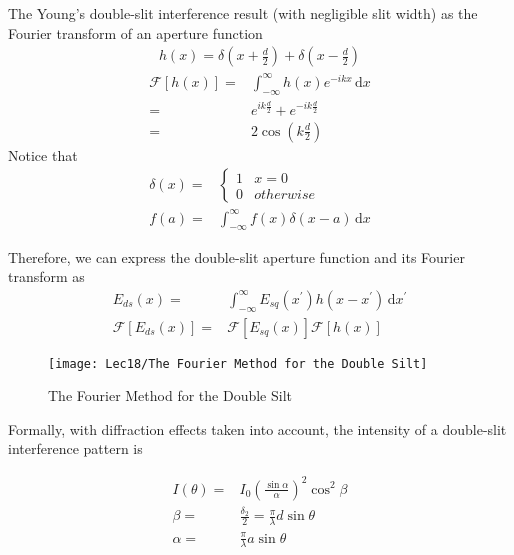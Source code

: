 The Young's double-slit interference result (with negligible slit width) as the Fourier transform of an aperture function
\begin{align*}
    h(x)=\delta\left(x+\frac{d}{2}\right)+\delta\left(x-\frac{d}{2}\right)
\end{align*}
\begin{align*}
    \mathcal{F}[h(x)]=&\int_{-\infty}^{\infty} h(x)e^{-ikx}\,\mathrm{d}x\\
    =&e^{ik\frac{d}{2}}+e^{-ik\frac{d}{2}}\\
    =&2\cos\left(k\frac{d}{2}\right)
\end{align*}
Notice that 
\begin{align*}
    \delta (x) =&\left\{ \begin{array}{cc}
        1 & x=0\\
        0 & otherwise
    \end{array} \right.\\
    f(a)=&\int_{-\infty}^{\infty}f(x)\delta (x-a)\,\mathrm{d}x
\end{align*}

Therefore, we can express the double-slit aperture function and its Fourier transform as 
\begin{align*}
    E_{ds}(x)=&\int_{-\infty}^{\infty}E_{sq}(x^{\prime})h(x-x^{\prime})\,\mathrm{d}x^{\prime}\\
    \mathcal{F}\left[E_{ds}(x)\right]=&\mathcal{F}\left[E_{sq}(x)\right]\mathcal{F}\left[h(x)\right]
\end{align*}

\begin{figure}[H]
    \centering
    \texttt{[image: Lec18/The Fourier Method for the Double Silt]}
    \caption{The Fourier Method for the Double Silt}
\end{figure}

Formally, with diffraction effects taken into account, the
intensity of a double-slit interference pattern is

\begin{align*}
    I(\theta)=&I_0\left(\frac{\sin\alpha}{\alpha}\right)^2 \cos^2\beta\\
    \beta=&\frac{\delta_2}{2}=\frac{\pi}{\lambda}d\sin\theta\\
    \alpha=&\frac{\pi}{\lambda}a\sin\theta
\end{align*}

